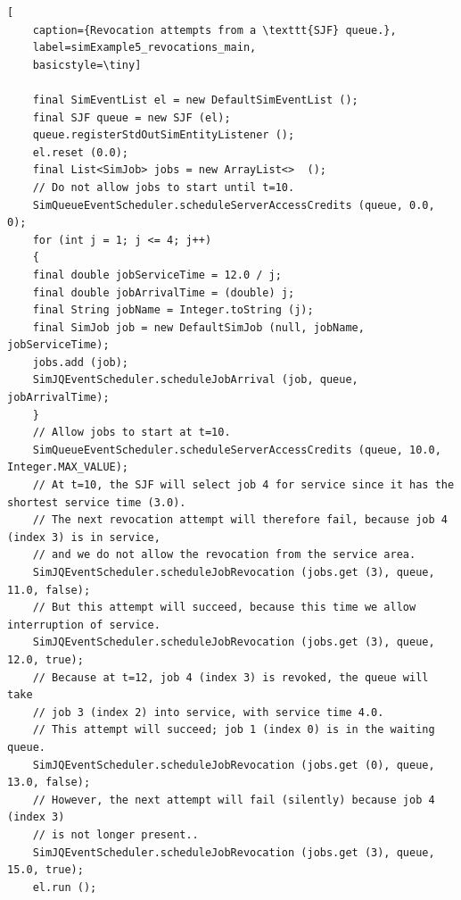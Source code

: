 \begin{lstfloat}
	\begin{lstlisting}[
	caption={Revocation attempts from a \texttt{SJF} queue.},
	label=simExample5_revocations_main,
	basicstyle=\tiny]
	
	final SimEventList el = new DefaultSimEventList ();
	final SJF queue = new SJF (el);
	queue.registerStdOutSimEntityListener ();
	el.reset (0.0);
	final List<SimJob> jobs = new ArrayList<>  ();
	// Do not allow jobs to start until t=10.
	SimQueueEventScheduler.scheduleServerAccessCredits (queue, 0.0, 0);
	for (int j = 1; j <= 4; j++)
	{
	final double jobServiceTime = 12.0 / j;
	final double jobArrivalTime = (double) j;
	final String jobName = Integer.toString (j);
	final SimJob job = new DefaultSimJob (null, jobName, jobServiceTime);
	jobs.add (job);
	SimJQEventScheduler.scheduleJobArrival (job, queue, jobArrivalTime);
	}
	// Allow jobs to start at t=10.
	SimQueueEventScheduler.scheduleServerAccessCredits (queue, 10.0, Integer.MAX_VALUE);
	// At t=10, the SJF will select job 4 for service since it has the shortest service time (3.0).
	// The next revocation attempt will therefore fail, because job 4 (index 3) is in service,
	// and we do not allow the revocation from the service area.
	SimJQEventScheduler.scheduleJobRevocation (jobs.get (3), queue, 11.0, false);
	// But this attempt will succeed, because this time we allow interruption of service.
	SimJQEventScheduler.scheduleJobRevocation (jobs.get (3), queue, 12.0, true);
	// Because at t=12, job 4 (index 3) is revoked, the queue will take
	// job 3 (index 2) into service, with service time 4.0.
	// This attempt will succeed; job 1 (index 0) is in the waiting queue.
	SimJQEventScheduler.scheduleJobRevocation (jobs.get (0), queue, 13.0, false);
	// However, the next attempt will fail (silently) because job 4 (index 3)
	// is not longer present..
	SimJQEventScheduler.scheduleJobRevocation (jobs.get (3), queue, 15.0, true);
	el.run ();
	
	\end{lstlisting}
\end{lstfloat}

